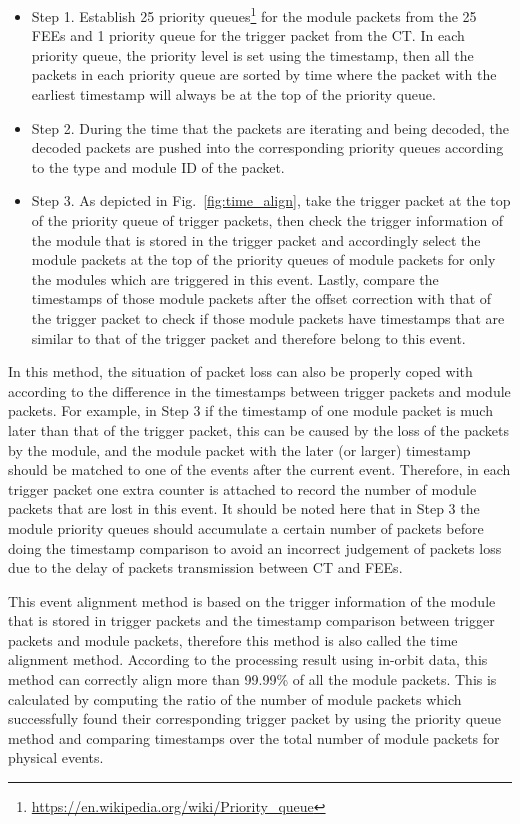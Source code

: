\documentclass{raa}
\begin{document}
\begin{itemize}
\item Step 1. Establish 25 priority queues\footnote{\url{https://en.wikipedia.org/wiki/Priority_queue}} for the module packets from the 25 FEEs and 1 priority queue for the trigger packet from the CT. In each priority queue, the priority level is set using the timestamp, then all the packets in each priority queue are sorted by time where the packet with the earliest timestamp will always be at the top of the priority queue.
\item Step 2. During the time that the packets are iterating and being decoded, the decoded packets are pushed into the corresponding priority queues according to the type and module ID of the packet.
\item Step 3. As depicted in Fig.~\ref{fig:time_align}, take the trigger packet at the top of the priority queue of trigger packets, then check the trigger information of the module that is stored in the trigger packet and accordingly select the module packets at the top of the priority queues of module packets for only the modules which are triggered in this event. Lastly, compare the timestamps of those module packets after the offset correction with that of the trigger packet to check if those module packets have timestamps that are similar to that of the trigger packet and therefore belong to this event.
\end{itemize}

In this method, the situation of packet loss can also be properly coped with according to the difference in the timestamps between trigger packets and module packets. For example, in Step 3 if the timestamp of one module packet is much later than that of the trigger packet, this can be caused by the loss of the packets by the module, and the module packet with the later (or larger) timestamp should be matched to one of the events after the current event. Therefore, in each trigger packet one extra counter is attached to record the number of module packets that are lost in this event. It should be noted here that in Step 3 the module priority queues should accumulate a certain number of packets before doing the timestamp comparison to avoid an incorrect judgement of packets loss due to the delay of packets transmission between CT and FEEs.

This event alignment method is based on the trigger information of the module that is stored in trigger packets and the timestamp comparison between trigger packets and module packets, therefore this method is also called the time alignment method. According to the processing result using in-orbit data, this method can correctly align more than 99.99\% of all the module packets. This is calculated by computing the ratio of the number of module packets which successfully found their corresponding trigger packet by using the priority queue method and comparing timestamps over the total number of module packets for physical events.
\end{document}
